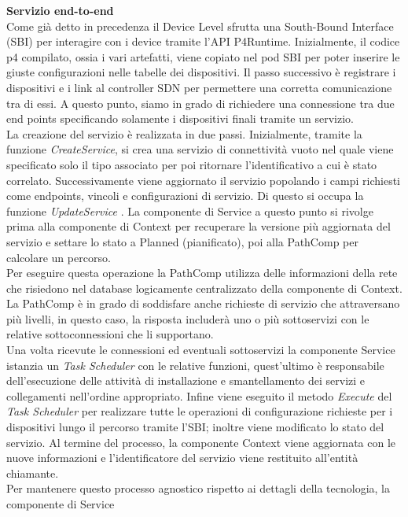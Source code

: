 \textbf{Servizio end-to-end}
\\Come già detto in precedenza il Device Level sfrutta una South-Bound Interface (SBI) per interagire con i device tramite l'API P4Runtime. 
Inizialmente, il codice p4 compilato, ossia i vari artefatti, viene copiato nel pod SBI per poter inserire le giuste configurazioni nelle tabelle dei dispositivi.
Il passo successivo è registrare i dispositivi e i link al controller SDN per permettere una corretta comunicazione tra di essi.
A questo punto, siamo in grado di richiedere una connessione tra due end points specificando solamente i dispositivi finali tramite un servizio.
\\La creazione del servizio è realizzata in due passi. 
Inizialmente, tramite la funzione \textit{CreateService}, si crea una servizio di connettività vuoto nel quale viene specificato solo il tipo associato per poi ritornare l'identificativo a cui è stato correlato.
Successivamente viene aggiornato il servizio popolando i campi richiesti come endpoints, vincoli e configurazioni di servizio. Di questo si occupa la funzione \textit{UpdateService} \cite{D32}.
La componente di Service a questo punto si rivolge prima alla componente di Context per recuperare la versione più aggiornata del servizio e settare lo stato a Planned (pianificato), poi alla PathComp per calcolare un percorso.
\\Per eseguire questa operazione la PathComp utilizza delle informazioni della rete che risiedono nel database logicamente centralizzato della componente di Context.
La PathComp è in grado di soddisfare anche richieste di servizio che attraversano più livelli, in questo caso, la risposta includerà uno o più sottoservizi con le relative sottoconnessioni che li supportano.
\\Una volta ricevute le connessioni ed eventuali sottoservizi la componente Service istanzia un \textit{Task Scheduler} con le relative funzioni, %
quest'ultimo è responsabile dell'esecuzione delle attività di installazione e smantellamento dei servizi e collegamenti nell'ordine appropriato.
Infine viene eseguito il metodo \textit{Execute} del \textit{Task Scheduler} per realizzare tutte le operazioni di configurazione richieste per i dispositivi lungo il percorso tramite l'SBI; inoltre viene modificato lo stato del servizio.
Al termine del processo, la componente Context viene aggiornata con le nuove informazioni e l’identificatore del servizio viene restituito all’entità chiamante.
\\Per mantenere questo processo agnostico rispetto ai dettagli della tecnologia, la componente di Service 
